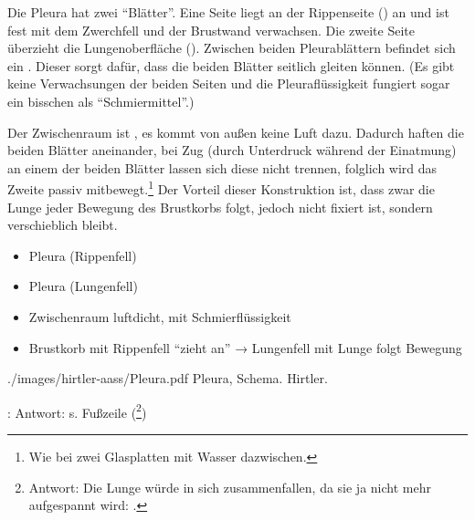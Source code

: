 {%
%
%
%
%
Die Pleura hat zwei \protect\enquote{Blätter}. Eine Seite 
liegt an der Rippenseite () an und ist fest
mit dem Zwerchfell und der Brustwand verwachsen. Die zweite
Seite  überzieht die Lungenoberfläche ().
Zwischen beiden Pleurablättern befindet sich ein
. Dieser sorgt dafür, dass die beiden
Blätter seitlich gleiten können. (Es gibt keine
Verwachsungen der beiden Seiten und die Pleuraflüssigkeit
fungiert sogar ein bisschen als
\protect\enquote{Schmiermittel}.)

Der Zwischenraum ist , es kommt von
außen keine Luft dazu. Dadurch haften die beiden Blätter
aneinander, bei Zug (durch Unterdruck während der Einatmung)
an einem der beiden Blätter lassen sich diese nicht trennen,
folglich wird das Zweite passiv mitbewegt.\footnote{Wie bei
zwei Glasplatten mit Wasser dazwischen.} Der Vorteil dieser
Konstruktion ist, dass zwar die Lunge jeder Bewegung des
Brustkorbs folgt, jedoch nicht fixiert ist, sondern
verschieblich bleibt.

 }
{
\begin{itemize}
    \item {} Pleura (Rippenfell)
    \item {} Pleura (Lungenfell)
    \item Zwischenraum luftdicht, mit Schmierflüssigkeit
    \item Brustkorb mit Rippenfell \protect\enquote{zieht an} → Lungenfell mit Lunge folgt
    Bewegung     
\end{itemize}
}
{./images/hirtler-aass/Pleura.pdf} {Pleura, Schema.} {Hirtler.}


:  Antwort: s.
Fußzeile (\footnote{Antwort: Die Lunge würde in sich
zusammenfallen, da sie ja nicht mehr aufgespannt wird:
.})


